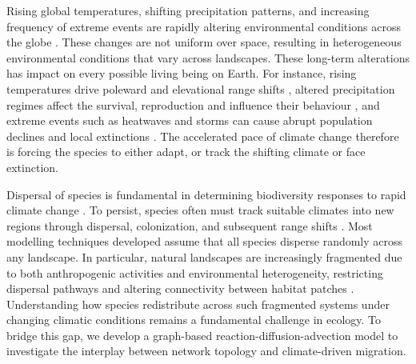 \documentclass[12pt]{article}
\begin{document}

Rising global temperatures, shifting precipitation patterns, and increasing frequency of extreme events are rapidly altering environmental conditions across the globe \cite{pinsky2019greater,deutsch2008impacts,urban2024climate}. These changes are not uniform over space, resulting in heterogeneous environmental conditions that vary across landscapes. These long-term alterations has impact on every possible living being on Earth. For instance, rising temperatures drive poleward and elevational range shifts \cite{chen2011rapid,pecl2017biodiversity,lenoir2020species}, altered precipitation regimes affect the survival, reproduction and influence their behaviour \cite{deguines2017precipitation}, and extreme events such as heatwaves and storms can cause abrupt population declines and local extinctions \cite{grant2017evolution,ummenhofer2017extreme}. The accelerated pace of climate change therefore is forcing the species to either adapt, or track the shifting climate or face extinction\cite{parmesan2003globally}. 

Dispersal of species is fundamental in determining biodiversity responses to rapid climate change \cite{travis2013dispersal,urban2016improving}. To persist, species often must track suitable climates into new regions through dispersal, colonization, and subsequent range shifts \cite{anderson2009dynamics}. Most modelling techniques developed assume that all species disperse randomly across any landscape. In particular, natural landscapes are increasingly fragmented due to both anthropogenic activities and environmental heterogeneity, restricting dispersal pathways and altering connectivity between habitat patches \cite{arancibia2022network}. Understanding how species redistribute across such fragmented systems under changing climatic conditions remains a fundamental challenge in ecology.  To bridge this gap, we develop a graph-based reaction-diffusion-advection model to investigate the interplay between network topology and climate-driven migration.
\end{document}
